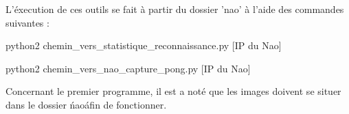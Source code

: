 \par L'éxecution de ces outils se fait à partir du dossier 'nao' à l'aide des commandes suivantes :
\begin{center}
	{python2 chemin\_vers\_statistique\_reconnaissance.py [IP du Nao]}
\end{center}
\begin{center}
	{python2 chemin\_vers\_nao\_capture\_pong.py [IP du Nao]}
\end{center}

\par Concernant le premier programme, il est a noté que les images doivent se situer dans le dossier \'nao\' afin de
fonctionner.

